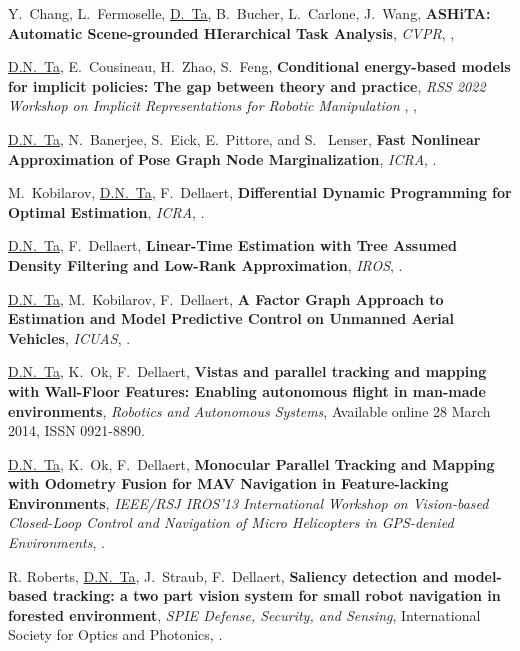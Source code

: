\documentclass[letterpaper,MMMyyyy,nonstopmode]{simpleresumecv}
\begin{document}
\begin{Body}
\begingroup
\renewcommand{\MaxNumberedItem}{[8888]}

\Gap
\NumberedItem{[20]}
{Y.~Chang, L.~Fermoselle, \underline{D.~Ta}, B.~Bucher, L.~Carlone, J.~Wang,
\textbf{ASHiTA: Automatic Scene-grounded HIerarchical Task Analysis}, 
\textit{CVPR},
,}

\Gap
\NumberedItem{[19]}
{\underline{D.N.~Ta}, E.~Cousineau, H.~Zhao, S.~Feng,
\textbf{Conditional energy-based models for implicit policies: The gap between theory and practice}, 
\textit{RSS 2022 Workshop on Implicit Representations for Robotic Manipulation
},
,}

\Gap
\NumberedItem{[18]}
{\underline{D.N.~Ta}, N.~Banerjee, S.~Eick, E.~Pittore, and S.~ Lenser,
\textbf{Fast Nonlinear Approximation of Pose Graph Node Marginalization},
\textit{ICRA},
.}

\Gap
\NumberedItem{[17]}
{M.~Kobilarov, \underline{D.N.~Ta}, F.~Dellaert,
\textbf{Differential Dynamic Programming for Optimal Estimation},
\textit{ICRA},
.}

\Gap
\NumberedItem{[16]}
{\underline{D.N.~Ta}, F.~Dellaert,
\textbf{Linear-Time Estimation with Tree Assumed Density Filtering and Low-Rank Approximation},
\textit{IROS},
.}

\Gap
\NumberedItem{[15]}
{\underline{D.N.~Ta}, M.~Kobilarov, F.~Dellaert,
\textbf{A Factor Graph Approach to Estimation and Model Predictive Control on Unmanned Aerial Vehicles},
\textit{ICUAS},
.}

\Gap
\NumberedItem{[14]}
{\underline{D.N.~Ta}, K.~Ok, F.~Dellaert,
\textbf{Vistas and parallel tracking and mapping with Wall-Floor Features: Enabling autonomous flight in man-made environments},
\textit{Robotics and Autonomous Systems},
Available online 28 March 2014, ISSN 0921-8890.}

\Gap
\NumberedItem{[13]}
{\underline{D.N.~Ta}, K.~Ok, F.~Dellaert,
\textbf{Monocular Parallel Tracking and Mapping with Odometry Fusion for MAV Navigation in Feature-lacking Environments},
\textit{IEEE/RSJ IROS'13 International Workshop on Vision-based Closed-Loop Control and Navigation of Micro Helicopters in GPS-denied Environments},
.}

\Gap
\NumberedItem{[12]}
{ R. Roberts, \underline{D.N.~Ta}, J.~Straub, F.~Dellaert,
\textbf{Saliency detection and model-based tracking: a two part vision system for small robot navigation in forested environment},
\textit{SPIE Defense, Security, and Sensing},
International Society for Optics and Photonics,
.}


\end{Body}
\end{document}

